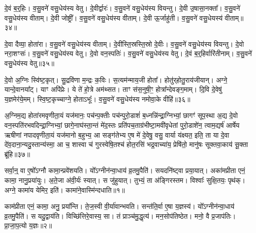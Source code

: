 दे॒वं ब॒र्॒हिः।
व॒सु॒वने॑ वसु॒धेय॑स्य वेतु।
दे॒वीर्द्वारः॑।
व॒सु॒वने॑ वसु॒धेय॑स्य वियन्तु।
दे॒वी उ॒षासा॒नक्ता᳚।
व॒सु॒वने॑ वसु॒धेय॑स्य वीताम्।
दे॒वी जोष्ट्री᳚।
व॒सु॒वने॑ वसु॒धेय॑स्य वीताम्।
दे॒वी ऊ॒र्जाहु॑ती।
व॒सु॒वने॑ वसु॒धेयस्य॑ वीताम्॥३४॥\ip

दे॒वा दैव्या॒ होता॑रा।
व॒सु॒वने॑ वसु॒धेय॑स्य वीताम्।
दे॒वीस्ति॒स्रस्ति॒स्रो दे॒वीः।
व॒सु॒वने॑ वसु॒धेय॑स्य वियन्तु।
दे॒वो नरा॒शꣳसः॑।
व॒सु॒वने॑ वसु॒धेय॑स्य वेतु।
दे॒वो वन॒स्पतिः॑।
व॒सु॒वने॑ वसु॒धेय॑स्य वेतु।
दे॒वं ब॒र्॒हिर्वारि॑तीनाम्।
व॒सु॒वने॑ वसु॒धेय॑स्य वेतु॥३५॥\ip

दे॒वो अ॒ग्निः स्वि॑ष्ट॒कृत्।
सु॒द्रवि॑णा म॒न्द्रः क॒विः।
स॒त्यम॑न्माय॒जी होता᳚।
होतु॑र्‌\mbox{}होतु॒राय॑जीयान्।
अग्ने॒ यान्दे॒वानया᳚ट्।
याꣳ अपि॑प्रेः।
ये ते॑ हो॒त्रे अम॑थ्सत।
ताꣳ स॑स॒नुषी॒ꣳ॒ होत्रा᳚न्देवङ्ग॒माम्।
दि॒वि दे॒वेषु॑ य॒ज्ञमेर॑ये॒मम्।
स्वि॒ष्ट॒कृच्चाग्ने॒ होता\-ऽभूः᳚।
व॒सु॒वने॑ वसु॒धेय॑स्य नमोवा॒के वीहि॑॥३६॥\ip\anuvakamend[वी॒तां॒ वे॒त्वभू॒रेकं॑ च]

अ॒ग्निम॒द्य होता॑रमवृणीता॒यं यज॑मानः॒ पच॑न्प॒क्तीः पच॑न्पुरो॒डाशं॑ ब॒ध्नन्नि॑न्द्रा॒ग्निभ्यां॒ छागꣳ॑ सूप॒स्था अ॒द्य दे॒वो वन॒स्पति॑रभवदिन्द्रा॒ग्निभ्यां॒ छागे॒नाघ॑स्ता॒न्तं मे॑द॒स्तः प्रति॑\-पच॒ताग्र॑भीष्टा॒मवी॑वृधेतां पुरो॒डाशे॑न॒ त्वाम॒द्यर्\mbox{}ष॑ आर्\mbox{}षेय ऋषीणां नपादवृणीता॒यं यज॑मानो ब॒हुभ्य॒ आ सङ्ग॑तेभ्य ए॒ष मे॑ दे॒वेषु॒ वसु॒ वार्या य॑क्ष्यत॒ इति॒ ता या दे॒वा दे॑व॒दाना॒न्यदु॒स्तान्य॑स्मा॒ आ च॒ शास्वा च॑ गुरस्वेषि॒तश्च॑ होत॒रसि॑ भद्र॒वाच्या॑य॒ प्रेषि॑तो॒ मानु॑षः सूक्तवा॒काय॑ सू॒क्ता ब्रू॑हि॥३७॥\ip\anuvakamend[अ॒ग्निम॒द्यैकम्᳚]


\clearpage
{}
\setcounter{anuvakam}{0}

सर्वा॒न्॒ वा ए॒षो᳚\-ऽग्नौ कामा॒न्प्रवे॑शयति।
यो᳚ऽग्नीन॑न्वा॒धाय॑ व्र॒तमु॒पैति॑।
सयदनि॑ष्ट्वा प्रया॒यात्।
अका॑मप्रीता एनं॒ कामा॒ नानु॒प्रया॑युः।
अ॒ते॒जा अ॑वी॒र्यः॑ स्यात्।
स जु॑हुयात्।
तुभ्यं॒ ता अ॑ङ्गिरस्तम।
विश्वाः᳚ सुक्षि॒तयः॒ पृथ॑क्।
अग्ने॒ कामा॑य येमिर॒ इति॑।
कामा॑ने॒वास्मि॑न्दधाति॥१॥\ip

काम॑प्रीता एनं॒ कामा॒ अनु॒ प्रया᳚न्ति।
ते॒ज॒स्वी वी॒र्या॑वान्भवति।
सन्त॑ति॒र्वा ए॒षा य॒ज्ञस्य॑।
यो᳚ऽग्नीन॑न्वा॒धाय॑ व्र॒तमु॒पैति॑।
स यदु॒द्वाय॑ति।
विच्छि॑त्तिरे॒वास्य॒ सा।
तं प्राञ्च॑मु॒द्धृत्य॑।
मन॒सोप॑तिष्ठेत।
मनो॒ वै प्र॒जा\-प॑तिः।
प्रा॒जा॒प॒त्यो य॒ज्ञः॥२॥\ip

